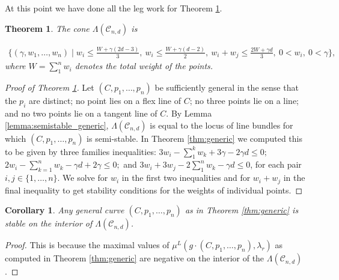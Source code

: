 \documentclass{amsart}
\newcommand{\mc}{\mathcal}
\numberwithin{equation}{section}
\newtheorem{thm}[prop]{Theorem}
\newtheorem{cor}[prop]{Corollary}
\theoremstyle{definition}
\begin{document}
At this point we have done all the leg work for Theorem \ref{thm:ample_cone}.

\begin{thm}
\label{thm:ample_cone}
    The cone $\Lambda(\mc{C}_{n,d})$ is

\begin{align*}
 \bigg\{
(\gamma, w_1, \ldots, w_n)
\; \bigg| \;
   w_i \leq \frac{W+\gamma(2d-3)}{3} , \ w_i \leq \frac{W+ \gamma(d-2)}{2}, \ w_i+w_j \leq \frac{2W+ \gamma d}{3}, \ 
   0 < w_i, \ 0 < \gamma
 \bigg\},
\end{align*}
where $W = \sum_1^n w_i$ denotes the total weight of the points.
\end{thm}

\begin{proof}[Proof of Theorem \ref{thm:ample_cone}]

Let $(C, p_1, \dots , p_n)$ be sufficiently general in the sense that the $p_i$ are distinct; no point lies on a flex line of $C$; no three points lie on a line; and no two points lie on a tangent line of $C$. By Lemma \ref{lemma:semistable_generic},  $\Lambda(\mc{C}_{n,d})$
 is equal to the locus of line bundles for which $(C, p_1, \dots , p_n)$ is semi-stable.  In Theorem \ref{thm:generic} we computed this to be given by three families inequalities: $3w_i - \sum_1^k w_k + 3 \gamma -2 \gamma d \leq 0;$ $2w_i - \sum_{k=1}^n w_k - \gamma d + 2 \gamma \leq  0;$ and $3w_i + 3w_j - 2 \sum_1^n w_k - \gamma d \leq 0$, for each pair $i,j \in \{1, \dots , n\}$. We solve for $w_i$ in the first two inequalities and for $w_i + w_j$ in the final inequality to get stability conditions for the weights of individual points.
   
\end{proof}


\begin{cor}
    Any general curve $(C, p_1 , \dots , p_n)$ as in Theorem \ref{thm:generic} is stable on the interior of $\Lambda(\mc{C}_{n,d})$.
\end{cor}
\begin{proof}
 This is because the maximal values of $\mu^L(g \cdot (C, p_1, \dots , p_n), \lambda_r)$ as computed in Theorem \ref{thm:generic} are negative on the interior of the $\Lambda(\mc{C}_{n,d})$.
\end{proof}


\end{document}
